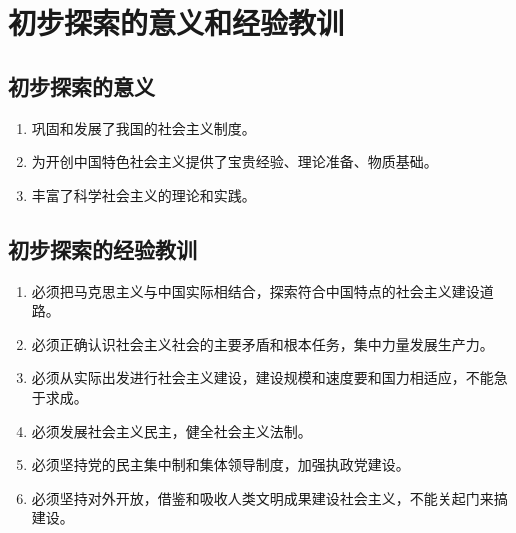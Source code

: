 \section{初步探索的意义和经验教训}

    \subsection{初步探索的意义}
    \begin{enumerate}
        \item 巩固和发展了我国的社会主义制度。
        \item 为开创中国特色社会主义提供了宝贵经验、理论准备、物质基础。
        \item 丰富了科学社会主义的理论和实践。
    \end{enumerate}

    \subsection{初步探索的经验教训}
    \begin{enumerate}
        \item 必须把马克思主义与中国实际相结合，探索符合中国特点的社会主义建设道路。
        \item 必须正确认识社会主义社会的主要矛盾和根本任务，集中力量发展生产力。
        \item 必须从实际出发进行社会主义建设，建设规模和速度要和国力相适应，不能急于求成。
        \item 必须发展社会主义民主，健全社会主义法制。
        \item 必须坚持党的民主集中制和集体领导制度，加强执政党建设。
        \item 必须坚持对外开放，借鉴和吸收人类文明成果建设社会主义，不能关起门来搞建设。
    \end{enumerate}
